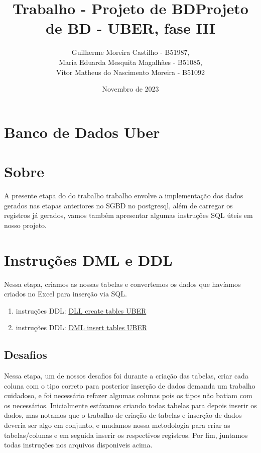 \documentclass{article}
\title{Trabalho - Projeto de BD}
\title{Projeto de BD - UBER, fase III}
\author{Guilherme Moreira Castilho - B51987,\\ Maria Eduarda Mesquita Magalhães - B51085,\\ Vitor Matheus do Nascimento Moreira - B51092}
\date{Novembro de 2023}
\begin{document}
\maketitle


\section*{\textbf{Banco de Dados Uber}}

\section{Sobre}

A presente etapa do do trabalho trabalho envolve a implementação dos dados gerados nas etapas anteriores no SGBD no postgresql, além de carregar os registros já gerados, vamos também apresentar algumas instruções SQL úteis em nosso projeto.

\section{Instruções DML e DDL}

Nessa etapa, criamos as nossas tabelas e convertemos os dados que havíamos criados no Excel para inserção via SQL.
\begin{enumerate}
    \item instruções DDL: \href{https://github.com/eduardammag/A2-BD-2023.2/blob/main/DDl%20create%20tables%20UBER.sql}{DLL create tables UBER}
    \item instruções DDL: \href{https://github.com/eduardammag/A2-BD-2023.2/blob/main/DML%20insert%20table%20UBER.sql}{DML insert tables UBER}
\end{enumerate}

\subsection{Desafios}

Nessa etapa, um de nossos desafios foi durante a criação das tabelas, criar cada coluna com o tipo correto para posterior inserção de dados demanda um trabalho cuidadoso, e foi necessário refazer algumas colunas pois os tipos não batiam com os necessários. Inicialmente estávamos criando todas tabelas para depois inserir os dados, mas notamos que o trabalho de criação de tabelas e inserção de dados deveria ser algo em conjunto, e mudamos nossa metodologia para criar as tabelas/colunas e em seguida inserir os respectivos registros. Por fim, juntamos todas instruções nos arquivos disponiveis acima.
\end{document}
